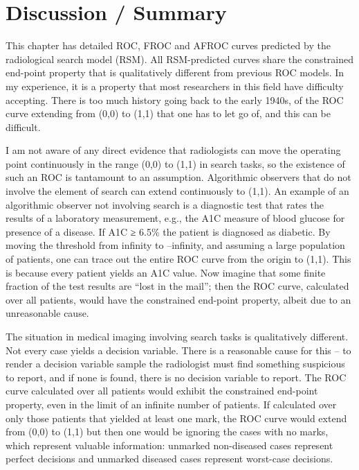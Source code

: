 \documentclass[
]{book}
\begin{document}
\hypertarget{rsm-goodbye-froc-discussion-summary}{%
\section{Discussion / Summary}\label{rsm-goodbye-froc-discussion-summary}}

This chapter has detailed ROC, FROC and AFROC curves predicted by the radiological search model (RSM). All RSM-predicted curves share the constrained end-point property that is qualitatively different from previous ROC models. In my experience, it is a property that most researchers in this field have difficulty accepting. There is too much history going back to the early 1940s, of the ROC curve extending from (0,0) to (1,1) that one has to let go of, and this can be difficult.

I am not aware of any direct evidence that radiologists can move the operating point continuously in the range (0,0) to (1,1) in search tasks, so the existence of such an ROC is tantamount to an assumption. Algorithmic observers that do not involve the element of search can extend continuously to (1,1). An example of an algorithmic observer not involving search is a diagnostic test that rates the results of a laboratory measurement, e.g., the A1C measure of blood glucose for presence of a disease. If A1C ≥ 6.5\% the patient is diagnosed as diabetic. By moving the threshold from infinity to --infinity, and assuming a large population of patients, one can trace out the entire ROC curve from the origin to (1,1). This is because every patient yields an A1C value. Now imagine that some finite fraction of the test results are ``lost in the mail''; then the ROC curve, calculated over all patients, would have the constrained end-point property, albeit due to an unreasonable cause.

The situation in medical imaging involving search tasks is qualitatively different. Not every case yields a decision variable. There is a reasonable cause for this -- to render a decision variable sample the radiologist must find something suspicious to report, and if none is found, there is no decision variable to report. The ROC curve calculated over all patients would exhibit the constrained end-point property, even in the limit of an infinite number of patients. If calculated over only those patients that yielded at least one mark, the ROC curve would extend from (0,0) to (1,1) but then one would be ignoring the cases with no marks, which represent valuable information: unmarked non-diseased cases represent perfect decisions and unmarked diseased cases represent worst-case decisions.
\end{document}
